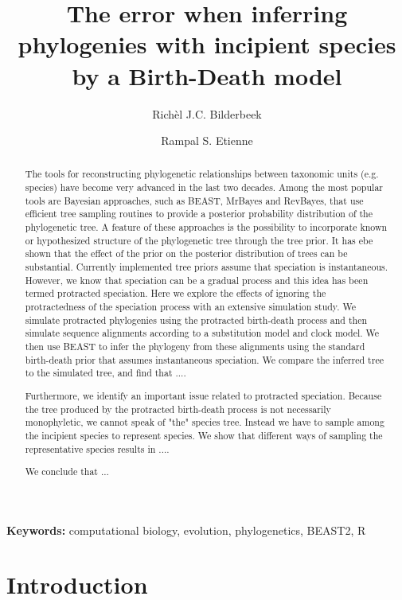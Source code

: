 \documentclass{article}
\title{The error when inferring phylogenies with incipient species by a Birth-Death model}
\author[1]{Rich\`el J.C. Bilderbeek}
\author[1]{Rampal S. Etienne}
\affil[1]{Groningen Institute for Evolutionary Life Sciences, University of Groningen, Groningen, The Netherlands}
\begin{document}
\maketitle

\begin{abstract}

  The tools for reconstructing phylogenetic relationships between taxonomic units (e.g. species) have become very advanced in the last two decades. Among the most popular tools are Bayesian approaches, such as BEAST, MrBayes and RevBayes, that use efficient tree sampling routines to provide a posterior probability distribution of the phylogenetic tree. A feature of these approaches is the possibility to incorporate known or hypothesized structure of the phylogenetic tree through the tree prior. It has ebe shown that the effect of the prior on the posterior distribution of trees can be substantial. Currently implemented tree priors assume that speciation is instantaneous. However, we know that speciation can be a gradual process and this idea has been termed protracted speciation. Here we explore the effects of ignoring the protractedness of the speciation process with an extensive simulation study. We simulate protracted phylogenies using the protracted birth-death process and then simulate sequence alignments according to a substitution model and clock model. We then use BEAST to infer the phylogeny from these alignments using the standard birth-death prior that assumes instantaneous speciation. We compare the inferred tree to the simulated tree, and find that ....

  Furthermore, we identify an important issue related to protracted speciation. Because the tree produced by the protracted birth-death process is not necessarily monophyletic, we cannot speak of "the" species tree. Instead we have to sample among the incipient species to represent species. We show that different ways of sampling the representative species results in ....

  We conclude that ...

\end{abstract}

{\bf Keywords:} computational biology, evolution, phylogenetics, BEAST2, R

\section{Introduction}
\end{document}
